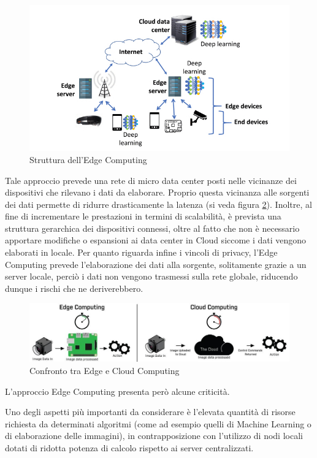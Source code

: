 \begin{figure}[H]
	\centering
	\includegraphics[width=\linewidth]{pics/edgecomputing.jpeg}
	\caption{Struttura dell'Edge Computing}
	\label{edge}
\end{figure}

Tale approccio prevede una rete di micro data center posti nelle vicinanze dei dispositivi che rilevano i dati da elaborare. Proprio questa vicinanza alle sorgenti dei dati permette di ridurre drasticamente la latenza (si veda figura \ref{edgevs}). Inoltre, al fine di incrementare le prestazioni in termini di scalabilità, è prevista una struttura gerarchica dei dispositivi connessi, oltre al fatto che non è necessario apportare modifiche o espansioni ai data center in Cloud siccome i dati vengono elaborati in locale. Per quanto riguarda infine i vincoli di privacy, l'Edge Computing prevede l'elaborazione dei dati alla sorgente, solitamente grazie a un server locale, perciò i dati non vengono trasmessi sulla rete globale, riducendo dunque i rischi che ne deriverebbero.

\begin{figure}[H]
	\centering
	\includegraphics[width=\linewidth, height= 0.15 \textheight]{pics/edgevscloud.jpeg}
	\caption{Confronto tra Edge e Cloud Computing}
	\label{edgevs}
\end{figure}

L'approccio Edge Computing presenta però alcune criticità.

Uno degli aspetti più importanti da considerare è l'elevata quantità di risorse richiesta da determinati algoritmi (come ad esempio quelli di Machine Learning o di elaborazione delle immagini), in contrapposizione con l'utilizzo di nodi locali dotati di ridotta potenza di calcolo rispetto ai server centralizzati.

